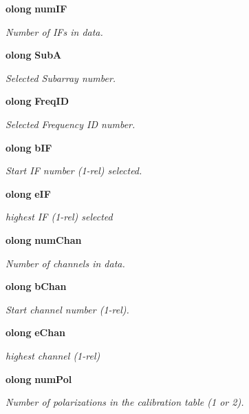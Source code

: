 \begin{CompactItemize}
{\bf olong} {\bf num\-IF}
\begin{CompactList}\small\item\em Number of IFs in data. \item\end{CompactList}\item 
{\bf olong} {\bf Sub\-A}
\begin{CompactList}\small\item\em Selected Subarray number. \item\end{CompactList}\item 
{\bf olong} {\bf Freq\-ID}
\begin{CompactList}\small\item\em Selected Frequency ID number. \item\end{CompactList}\item 
{\bf olong} {\bf b\-IF}
\begin{CompactList}\small\item\em Start IF number (1-rel) selected. \item\end{CompactList}\item 
{\bf olong} {\bf e\-IF}
\begin{CompactList}\small\item\em highest IF (1-rel) selected \item\end{CompactList}\item 
{\bf olong} {\bf num\-Chan}
\begin{CompactList}\small\item\em Number of channels in data. \item\end{CompactList}\item 
{\bf olong} {\bf b\-Chan}
\begin{CompactList}\small\item\em Start channel number (1-rel). \item\end{CompactList}\item 
{\bf olong} {\bf e\-Chan}
\begin{CompactList}\small\item\em highest channel (1-rel) \item\end{CompactList}\item 
{\bf olong} {\bf num\-Pol}
\begin{CompactList}\small\item\em Number of polarizations in the calibration table (1 or 2). \item\end{CompactList}\item 

\end{CompactItemize}
